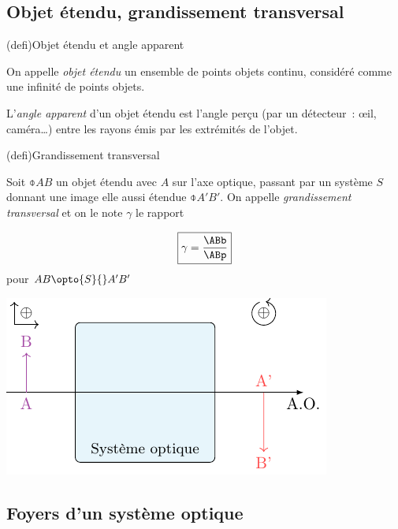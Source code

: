 \documentclass[../../main/main.tex]{subfiles}
\begin{document}
\subsection{Objet étendu, grandissement transversal}
\begin{tcbraster}[raster columns=3, raster equal height=rows]
	\begin{tcb}[label=def:objet](defi){Objet étendu et angle apparent}

		On appelle \textit{objet étendu} un ensemble de points objets continu,
		considéré comme une infinité de points objets.\bigbreak

		L'\textit{angle apparent} d'un objet étendu est l'angle perçu (par un
		détecteur~: œil, caméra…) entre les rayons émis par les extrémités de
		l'objet.

	\end{tcb}
	\begin{tcb}[%
			label=def:grand,
			raster multicolumn=2,
			sidebyside](defi){Grandissement transversal}

		Soit $\obar{AB}$ un objet étendu avec $A$ sur l'axe optique, passant par
		un système $S$ donnant une image elle aussi étendue $\obar{A'B'}$. On
		appelle \textit{grandissement transversal} et on le note $\gamma$ le
		rapport

		\[\boxed{\gamma = \frac{\ABb}{\ABp}}\]
		pour $AB \opto{S}{} A'B' $
		\tcblower
		\begin{center}
			\includegraphics[width=\linewidth]{syst_opt_objet.pdf}
			\label{fig:obj_et}
		\end{center}
	\end{tcb}
\end{tcbraster}

\subsection{Foyers d'un système optique}
\end{document}
